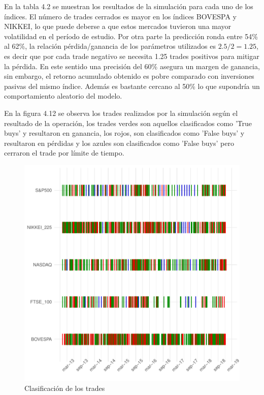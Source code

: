 \documentclass[a4paper,12pt]{Latex/Classes/PhDthesisPSnPDF}
\begin{document}
En la tabla 4.2 se muestran los resultados de la simulación para cada uno de los índices. El número de trades cerrados es mayor en los índices BOVESPA y NIKKEI, lo que puede deberse a que estos mercados tuvieron una mayor volatilidad en el período de estudio. Por otra parte la predicción ronda entre 54\% al 62\%, la relación pérdida/ganancia de los parámetros utilizados es $2.5/2 = 1.25$, es decir que por cada trade negativo se necesita 1.25 trades positivos para mitigar la pérdida. En este sentido una precisión del 60\% asegura un margen de ganancia, sin embargo, el retorno acumulado obtenido es pobre comparado con inversiones pasivas del mismo índice. Además es bastante cercano al 50\% lo que supondría un comportamiento aleatorio del modelo.
 

En la figura 4.12 se observa los trades realizados por la simulación según el resultado de la operación, los trades verdes son aquellos clasificados como 'True buys' y resultaron en ganancia, los rojos, son clasificados como 'False buys' y resultaron en pérdidas y los azules son clasificados como 'False buys' pero cerraron el trade por límite de tiempo.

\begin{figure}[H]
\centering
\includegraphics{main-031}
\caption{Clasificación de los trades}
\end{figure}
\end{document}
